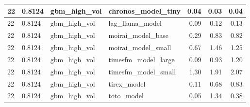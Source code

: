 {\begin{tabular}{llllrrr}
\midrule
22 & 0.8124 & gbm\_high\_vol & chronos\_model\_tiny & 0.04 & 0.03 & 0.04 \\
\midrule
22 & 0.8124 & gbm\_high\_vol & lag\_llama\_model & 0.09 & 0.12 & 0.13 \\
\midrule
22 & 0.8124 & gbm\_high\_vol & moirai\_model\_base & 0.29 & 0.83 & 0.82 \\
\midrule
22 & 0.8124 & gbm\_high\_vol & moirai\_model\_small & 0.67 & 1.46 & 1.25 \\
\midrule
22 & 0.8124 & gbm\_high\_vol & timesfm\_model\_large & 0.09 & 0.93 & 1.20 \\
\midrule
22 & 0.8124 & gbm\_high\_vol & timesfm\_model\_small & 1.30 & 1.91 & 2.07 \\
\midrule
22 & 0.8124 & gbm\_high\_vol & tirex\_model & 0.11 & 0.68 & 0.83 \\
\midrule
22 & 0.8124 & gbm\_high\_vol & toto\_model & 0.05 & 1.34 & 0.38 \\
\bottomrule
\end{tabular}
}